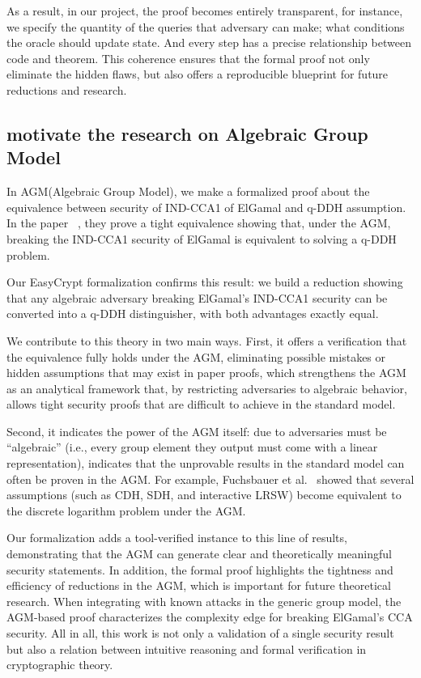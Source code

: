 As a result, in our project, the proof becomes entirely transparent, for instance, we specify the quantity of the queries that adversary can make; what conditions the oracle should update state. And every step has a precise relationship between code and theorem. This coherence ensures that the formal proof not only eliminate the hidden flaws, but also offers a reproducible blueprint for future reductions and research.



\subsection{motivate the research on Algebraic Group Model}
In AGM(Algebraic Group Model), we make a formalized proof about the equivalence between security of IND-CCA1 of ElGamal and q-DDH assumption. In the paper ~\cite{fuchsbauer2018}, they prove a tight equivalence showing that, under the AGM, breaking the IND-CCA1 security of ElGamal is equivalent to solving a q-DDH problem.

Our EasyCrypt formalization confirms this result: we build a reduction showing that any algebraic adversary breaking ElGamal’s IND-CCA1 security can be converted into a q-DDH distinguisher, with both advantages exactly equal.

We contribute to this theory in two main ways. First, it offers a verification that the equivalence fully holds under the AGM, eliminating possible mistakes or hidden assumptions that may exist in paper proofs, which strengthens the AGM as an analytical framework that, by restricting adversaries to algebraic behavior, allows tight security proofs that are difficult to achieve in the standard model.


Second, it indicates the power of the AGM itself: due to adversaries must be “algebraic” (i.e., every group element they output must come with a linear representation), indicates that the unprovable results in the standard model can often be proven in the AGM.
For example, Fuchsbauer et al.~\cite{fuchsbauer2018} showed that several assumptions (such as CDH, SDH, and interactive LRSW) become equivalent to the discrete logarithm problem under the AGM.

Our formalization adds a tool-verified instance to this line of results, demonstrating that the AGM can generate clear and theoretically meaningful security statements.
In addition, the formal proof highlights the tightness and efficiency of reductions in the AGM, which is important for future theoretical research.
When integrating with known attacks in the generic group model, the AGM-based proof characterizes the complexity edge for breaking ElGamal’s CCA security. All in all, this work is not only a validation of a single security result but also a relation between intuitive reasoning and formal verification in cryptographic theory.


